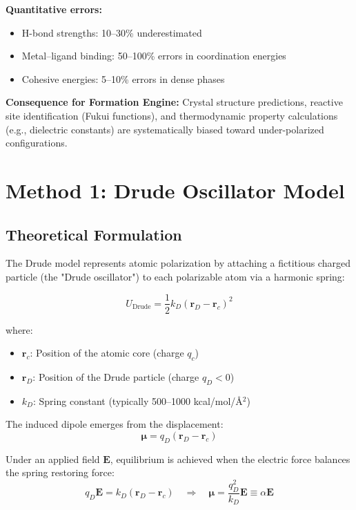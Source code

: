 \documentclass[11pt,letterpaper]{article}
\newcommand{\vr}{\mathbf{r}}
\newcommand{\vE}{\mathbf{E}}
\newcommand{\vmu}{\boldsymbol{\mu}}
\begin{document}
\textbf{Quantitative errors:}
\begin{itemize}
    \item H-bond strengths: 10--30\% underestimated\cite{lamoureux2003}
    \item Metal--ligand binding: 50--100\% errors in coordination energies\cite{comba2003}
    \item Cohesive energies: 5--10\% errors in dense phases\cite{hermann2017}
\end{itemize}

\textbf{Consequence for Formation Engine:} Crystal structure predictions, reactive site identification (Fukui functions), and thermodynamic property calculations (e.g., dielectric constants) are systematically biased toward under-polarized configurations.

\section{Method 1: Drude Oscillator Model}
\label{sec:drude}

\subsection{Theoretical Formulation}

The Drude model represents atomic polarization by attaching a fictitious charged particle (the "Drude oscillator") to each polarizable atom via a harmonic spring\cite{lamoureux2003,yu2013}:

\begin{equation}
U_{\text{Drude}} = \frac{1}{2} k_D (\vr_D - \vr_c)^2
\end{equation}

where:
\begin{itemize}
    \item $\vr_c$: Position of the atomic core (charge $q_c$)
    \item $\vr_D$: Position of the Drude particle (charge $q_D < 0$)
    \item $k_D$: Spring constant (typically 500--1000 kcal/mol/\AA$^2$)
\end{itemize}

The induced dipole emerges from the displacement:
\begin{equation}
\vmu = q_D (\vr_D - \vr_c)
\end{equation}

Under an applied field $\vE$, equilibrium is achieved when the electric force balances the spring restoring force:
\begin{equation}
q_D \vE = k_D (\vr_D - \vr_c) \quad \Rightarrow \quad \vmu = \frac{q_D^2}{k_D} \vE \equiv \alpha \vE
\end{equation}
\end{document}
